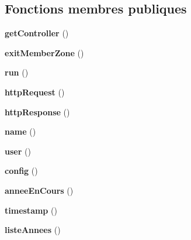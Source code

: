 \subsection*{Fonctions membres publiques}
\begin{DoxyCompactItemize}
\item 
\hypertarget{class_library_1_1_application_aa8b89e0bad51878addc1300cd3e95b5c}{{\bfseries get\+Controller} ()}\label{class_library_1_1_application_aa8b89e0bad51878addc1300cd3e95b5c}

\item 
\hypertarget{class_library_1_1_application_a2a559a2b312fe08ae8ad0fc0c83f5ba1}{{\bfseries exit\+Member\+Zone} ()}\label{class_library_1_1_application_a2a559a2b312fe08ae8ad0fc0c83f5ba1}

\item 
\hypertarget{class_library_1_1_application_afb0fafe7e02a3ae1993c01c19fad2bae}{{\bfseries run} ()}\label{class_library_1_1_application_afb0fafe7e02a3ae1993c01c19fad2bae}

\item 
\hypertarget{class_library_1_1_application_aa2fce355c13ef8ba9e4942db1feba626}{{\bfseries http\+Request} ()}\label{class_library_1_1_application_aa2fce355c13ef8ba9e4942db1feba626}

\item 
\hypertarget{class_library_1_1_application_ab77789937e7ae37ee11f05a520859dd3}{{\bfseries http\+Response} ()}\label{class_library_1_1_application_ab77789937e7ae37ee11f05a520859dd3}

\item 
\hypertarget{class_library_1_1_application_a4b516aaa5fa38da4fed24ab6001627e2}{{\bfseries name} ()}\label{class_library_1_1_application_a4b516aaa5fa38da4fed24ab6001627e2}

\item 
\hypertarget{class_library_1_1_application_ae8a275690ff1b618e1947378b0ed73ae}{{\bfseries user} ()}\label{class_library_1_1_application_ae8a275690ff1b618e1947378b0ed73ae}

\item 
\hypertarget{class_library_1_1_application_a8a549a19ec81f3aafb2b231aaa12e138}{{\bfseries config} ()}\label{class_library_1_1_application_a8a549a19ec81f3aafb2b231aaa12e138}

\item 
\hypertarget{class_library_1_1_application_a45ed16f46637b01983664deebcb96abb}{{\bfseries annee\+En\+Cours} ()}\label{class_library_1_1_application_a45ed16f46637b01983664deebcb96abb}

\item 
\hypertarget{class_library_1_1_application_a827637c36d710b7c19476fbff9c107d2}{{\bfseries timestamp} ()}\label{class_library_1_1_application_a827637c36d710b7c19476fbff9c107d2}

\item 
\hypertarget{class_library_1_1_application_ab0e35ff101ee6cc86f96ed93d45822a3}{{\bfseries liste\+Annees} ()}\label{class_library_1_1_application_ab0e35ff101ee6cc86f96ed93d45822a3}

\end{DoxyCompactItemize}
